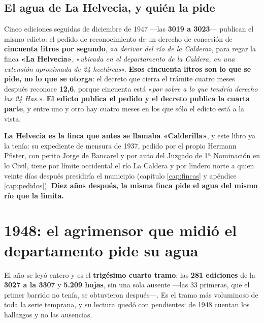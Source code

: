 \subsection*{El agua de La Helvecia, y quién la pide}

Cinco ediciones seguidas de diciembre de 1947 ---las \textbf{3019 a 3023}--- publican el
mismo edicto: el pedido de reconocimiento de un derecho de concesión de \textbf{cincuenta
litros por segundo}, «\textit{a derivar del río de la Caldera}», para regar la finca
\textbf{«La Helvecia»}, «\textit{ubicada en el departamento de la Caldera, en una extensión
aproximada de 24 hectáreas}». \textbf{Esos cincuenta litros son lo que se pide, no lo que
se otorga}: el decreto que cierra el trámite cuatro meses después reconoce
\textbf{12,6}, porque cincuenta está «\textit{por sobre a lo que tendría derecho las 24
Has.}». \textbf{El edicto publica el pedido y el decreto publica la cuarta parte}, y entre
uno y otro hay cuatro meses en los que sólo el edicto está a la vista.

\textbf{La Helvecia es la finca que antes se llamaba «Calderilla»}, y este libro ya la
tenía: su expediente de mensura de 1937, pedido por el propio Hermann Pfister, con perito Jorge de Bancarel y por auto del Juzgado
de 1ª Nominación en lo Civil, tiene por límite occidental el río La Caldera y por lindero
norte a quien veinte días después presidiría el municipio (capítulo \ref{cap:fincas} y
apéndice \ref{cap:pedidos}). \textbf{Diez años después, la misma finca pide el agua del mismo
río que la limita.}

\section{1948: el agrimensor que midió el departamento pide su agua}

El año se leyó entero y es el \textbf{trigésimo cuarto tramo}: las \textbf{281 ediciones} de la
\textbf{3027 a la 3307} y \textbf{5.209 hojas}, sin una sola ausente ---las 33 primeras, que el
primer barrido no tenía, se obtuvieron después---. Es el tramo más voluminoso de toda la serie
temprana, y su lectura quedó con pendientes: de 1948 cuentan los hallazgos y no las ausencias.

